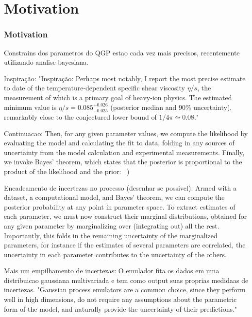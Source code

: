 \section{Motivation} %


\begin{frame}
  \frametitle{Motivation}

Constrains dos parametros do QGP estao cada vez mais precisos, recentemente utilizando analise bayesiana.

Inspiração: "Inspiração: Perhaps most notably, I report the most precise estimate to date
of the temperature-dependent specific shear viscosity $\eta/s$, the measurement
of which is a primary goal of heavy-ion physics. The estimated minimum value is
$\eta/s = 0.085^{+0.026}_{-0.025}$ (posterior median and 90\% uncertainty),
remarkably close to the conjectured lower bound of $1/4\pi \simeq 0.08$."~\cite{bernhard_bayesian_2018}


Continuacao: Then, for any given parameter values, we compute the likelihood by evaluating the model and calculating the fit to data, folding in any sources of uncertainty from the model calculation and experimental measurements. Finally, we invoke Bayes’ theorem, which states that the posterior is proportional to the product of the likelihood and the prior: ~\cite{bernhard_bayesian_2018})

Encadeamento de incertezas no processo (desenhar se possivel): Armed with a dataset, a computational model, and Bayes’ theorem, we can compute the posterior probability at any point in parameter space. To extract estimates of each parameter, we must now construct their marginal distributions, obtained for any given parameter by marginalizing over (integrating out) all the rest. Importantly, this folds in the remaining uncertainty of the marginalized parameters, for instance if the estimates of several parameters are correlated, the uncertainty in each parameter contributes to the uncertainty of the others.

Mais um empilhamento de incertezas: O emulador fita os dados em uma distribuicao gaussiana multivariada e tem como output suas proprias medidaas de incertezas. "Gaussian process emulators are a common choice, since they perform well in high dimensions, do not require any assumptions about the parametric form of the model, and naturally provide the uncertainty of their predictions."~\cite{bernhard_bayesian_2018}  
\end{frame}

